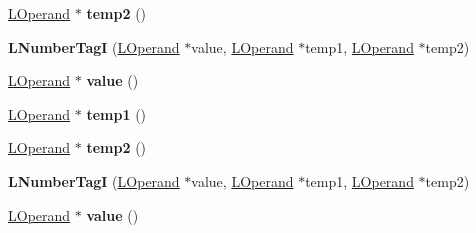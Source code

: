 \begin{DoxyCompactItemize}
\item 
\hyperlink{classv8_1_1internal_1_1_l_operand}{L\+Operand} $\ast$ {\bfseries temp2} ()\hypertarget{classv8_1_1internal_1_1_l_number_tag_i_aaa03e3b699a9c03b971db41b85de0351}{}\label{classv8_1_1internal_1_1_l_number_tag_i_aaa03e3b699a9c03b971db41b85de0351}

\item 
{\bfseries L\+Number\+TagI} (\hyperlink{classv8_1_1internal_1_1_l_operand}{L\+Operand} $\ast$value, \hyperlink{classv8_1_1internal_1_1_l_operand}{L\+Operand} $\ast$temp1, \hyperlink{classv8_1_1internal_1_1_l_operand}{L\+Operand} $\ast$temp2)\hypertarget{classv8_1_1internal_1_1_l_number_tag_i_a4454430c378e86af6c4da1c174621290}{}\label{classv8_1_1internal_1_1_l_number_tag_i_a4454430c378e86af6c4da1c174621290}

\item 
\hyperlink{classv8_1_1internal_1_1_l_operand}{L\+Operand} $\ast$ {\bfseries value} ()\hypertarget{classv8_1_1internal_1_1_l_number_tag_i_af1937f50e27c8665954070a538f640e4}{}\label{classv8_1_1internal_1_1_l_number_tag_i_af1937f50e27c8665954070a538f640e4}

\item 
\hyperlink{classv8_1_1internal_1_1_l_operand}{L\+Operand} $\ast$ {\bfseries temp1} ()\hypertarget{classv8_1_1internal_1_1_l_number_tag_i_a2fecebdcf5d9ce508e3fd3f24ee82850}{}\label{classv8_1_1internal_1_1_l_number_tag_i_a2fecebdcf5d9ce508e3fd3f24ee82850}

\item 
\hyperlink{classv8_1_1internal_1_1_l_operand}{L\+Operand} $\ast$ {\bfseries temp2} ()\hypertarget{classv8_1_1internal_1_1_l_number_tag_i_aaa03e3b699a9c03b971db41b85de0351}{}\label{classv8_1_1internal_1_1_l_number_tag_i_aaa03e3b699a9c03b971db41b85de0351}

\item 
{\bfseries L\+Number\+TagI} (\hyperlink{classv8_1_1internal_1_1_l_operand}{L\+Operand} $\ast$value, \hyperlink{classv8_1_1internal_1_1_l_operand}{L\+Operand} $\ast$temp1, \hyperlink{classv8_1_1internal_1_1_l_operand}{L\+Operand} $\ast$temp2)\hypertarget{classv8_1_1internal_1_1_l_number_tag_i_a4454430c378e86af6c4da1c174621290}{}\label{classv8_1_1internal_1_1_l_number_tag_i_a4454430c378e86af6c4da1c174621290}

\item 
\hyperlink{classv8_1_1internal_1_1_l_operand}{L\+Operand} $\ast$ {\bfseries value} ()\hypertarget{classv8_1_1internal_1_1_l_number_tag_i_af1937f50e27c8665954070a538f640e4}{}\label{classv8_1_1internal_1_1_l_number_tag_i_af1937f50e27c8665954070a538f640e4}


\end{DoxyCompactItemize}
